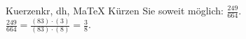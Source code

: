 \begin{MAufgabe}{Kuerzen}{kr, dh, MaTeX}
K\"urzen Sie soweit m\"oglich: $\frac{249}{664}$.\\ 
\ifLsg\MLoesung
\quad $\frac{249}{664}=\frac{(83)\cdot(3)}{(83)\cdot(8)}=\frac{3}{8}$.\else\relax\fi
 \end{MAufgabe}